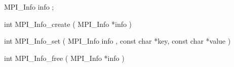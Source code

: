 MPI_Info info ;

int MPI_Info_create ( MPI_Info *info )

int MPI_Info_set ( MPI_Info info , const char *key, const char *value )

int MPI_Info_free ( MPI_Info *info )
